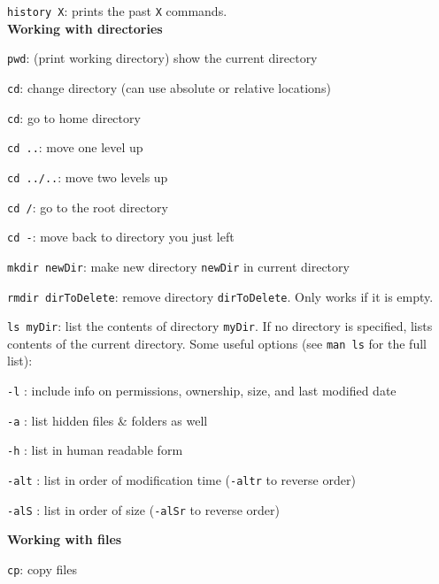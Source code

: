 \documentclass[11pt]{article}
\begin{document}
\texttt{history X}: prints the past \texttt{X} commands.\\ 

\textbf{Working with directories}

\texttt{pwd}: (print working directory) show the current directory

\texttt{cd}: change directory (can use absolute or relative locations)
\vspace{-2mm}
\begin{itemize*} 
\item  \texttt{cd}: go to home directory
\item  \texttt{cd ..}: move one level up
\item  \texttt{cd ../..}: move two levels up
\item  \texttt{cd /}: go to the root directory
\item  \texttt{cd -}: move back to directory you just left
\end{itemize*}

\texttt{mkdir newDir}: make new directory \texttt{newDir} in current directory

\texttt{rmdir dirToDelete}: remove directory \texttt{dirToDelete}. Only works if it is empty.

\texttt{ls myDir}: list the contents of directory \texttt{myDir}. If no directory is specified, lists contents of the current directory. Some useful options (see \texttt{man ls} for the full list): 
\vspace{-2mm}
\begin{description*}
\item[\ \ \ ] \texttt{-l} : include info on permissions, ownership, size, and last modified date
\item[\ \ \ ] \texttt{-a} : list hidden files \& folders as well
\item[\ \ \ ] \texttt{-h} : list in human readable form
\item[\ \ \ ] \texttt{-alt} : list in order of modification time (\texttt{-altr} to reverse order)
\item[\ \ \ ] \texttt{-alS} : list in order of size (\texttt{-alSr} to reverse order)\\
\end{description*}

\vspace{2cm}

\textbf{Working with files}

\texttt{cp}: copy files
\vspace{-2mm}
\end{document}
